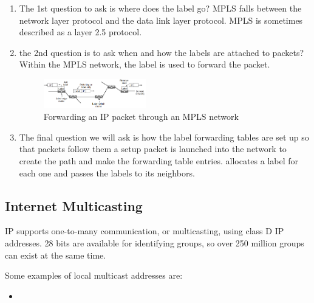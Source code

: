 \begin{enumerate}
    \item The 1st question to ask is where does the label go?
    \subitem MPLS falls between the network layer protocol and the data link layer protocol. MPLS is sometimes described as a layer 2.5 protocol. 
    \item the 2nd question is to ask when and how the labels are attached to packets?%
    \subitem Within the MPLS network, the label is used to forward the packet.
    \begin{figure}[!htb]
        \centering
        \includegraphics[width=0.42\textwidth]{pic/CN5/Forwarding an IP packet through an MPLS network}
        \caption{Forwarding an IP packet through an MPLS network}
    \end{figure}
    \item The final question we will ask is how the label forwarding tables are set up so that packets follow them %
    \subitem a setup packet is launched into the
    network to create the path and make the forwarding table entries. allocates a label for each
    one and passes the labels to its neighbors. 
\end{enumerate}

\subsection{Internet Multicasting}
IP supports one-to-many communication, or multicasting, using class D IP addresses. 28 bits are available for identifying groups, so over 250 million
groups can exist at the same time.

Some examples of local multicast addresses are:
\begin{itemize}%
    \item 
\end{itemize}

